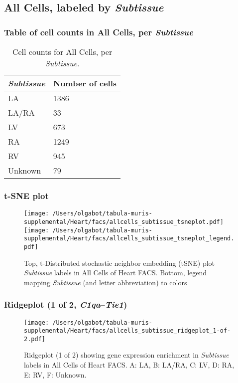 \clearpage

\subsection{All Cells, labeled by \emph{Subtissue}}
\subsubsection{Table of cell counts in All Cells, per \emph{Subtissue}}\begin{table}[h]
\centering
\label{my-label}
\begin{tabular}{@{}ll@{}}
\toprule

\emph{Subtissue}& Number of cells \\ \midrule
LA & 1386 \\

LA/RA & 33 \\

LV & 673 \\

RA & 1249 \\

RV & 945 \\

Unknown & 79 \\
\bottomrule
\end{tabular}
\caption{Cell counts for All Cells, per \emph{Subtissue}.}
\end{table}

\clearpage
\subsubsection{t-SNE plot}
\begin{figure}[h]
\centering
\texttt{[image: /Users/olgabot/tabula-muris-supplemental/Heart/facs/allcells\_subtissue\_tsneplot.pdf]}
\texttt{[image: /Users/olgabot/tabula-muris-supplemental/Heart/facs/allcells\_subtissue\_tsneplot\_legend.pdf]}
\caption{Top, t-Distributed stochastic neighbor embedding (tSNE) plot  \emph{Subtissue} labels in All Cells of Heart FACS. Bottom, legend mapping \emph{Subtissue} (and letter abbreviation) to colors}
\end{figure}


\clearpage

\subsubsection{Ridgeplot (1 of 2, \emph{C1qa}--\emph{Tie1})}
\begin{figure}[h]
\centering
\texttt{[image: /Users/olgabot/tabula-muris-supplemental/Heart/facs/allcells\_subtissue\_ridgeplot\_1-of-2.pdf]}

\caption{ Ridgeplot (1 of 2)  showing gene expression enrichment in \emph{Subtissue} labels in All Cells of Heart FACS. A: LA, B: LA/RA, C: LV, D: RA, E: RV, F: Unknown.}
\end{figure}


